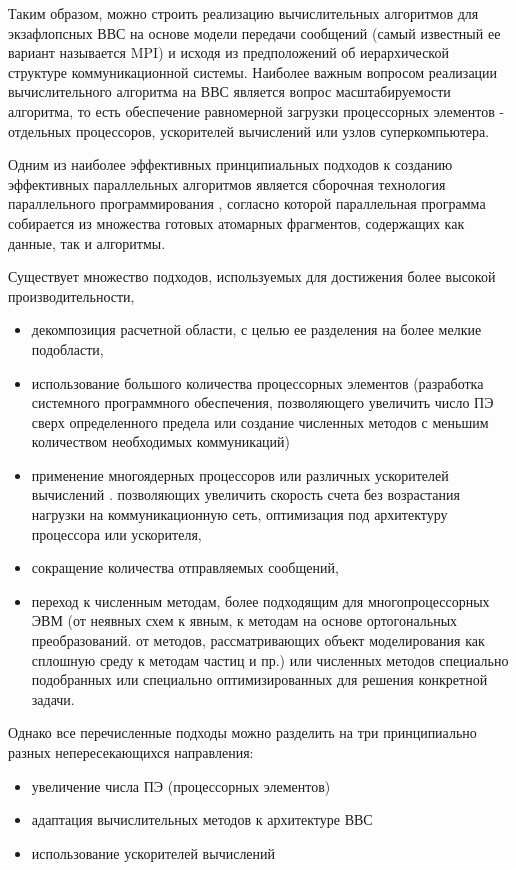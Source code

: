Таким образом, можно строить реализацию вычислительных алгоритмов для 
экзафлопсных ВВС на основе модели передачи сообщений (самый известный ее вариант называется MPI) и исходя из предположений об иерархической структуре коммуникационной системы.
Наиболее важным вопросом реализации вычислительного алгоритма на ВВС является вопрос масштабируемости алгоритма, то есть обеспечение равномерной загрузки процессорных элементов - отдельных процессоров, ускорителей вычислений или узлов суперкомпьютера.  

Одним из наиболее эффективных принципиальных подходов к созданию эффективных параллельных алгоритмов является сборочная технология параллельного программирования \cite{MalyshkinSynthesis,MalyshkinASSY,Kraeva2001,
	MalyshkinTsigulin}, согласно которой параллельная программа собирается из множества   готовых атомарных фрагментов, содержащих как данные, так и алгоритмы.

Существует множество подходов, используемых для достижения более высокой производительности, 
\begin{itemize}
	\item декомпозиция расчетной области\cite{Liewer1989,Kraeva2001,Stijnman2003, Eastwood1995}, с целью ее разделения на более мелкие подобласти, 
	\item использование большого количества процессорных элементов (разработка системного программного обеспечения, позволяющего увеличить число ПЭ сверх определенного предела
	\cite{Gropp2009} или создание численных методов с меньшим количеством необходимых коммуникаций)
	\item применение многоядерных процессоров или различных ускорителей вычислений \cite{SteYuz13}. позволяющих увеличить скорость счета без возрастания нагрузки на коммуникационную сеть, оптимизация под архитектуру процессора или ускорителя, 
	\item сокращение количества отправляемых сообщений, 
	\item переход к численным методам, более подходящим для многопроцессорных ЭВМ (от неявных схем к явным, к методам на основе ортогональных преобразований. от методов, рассматривающих объект моделирования как сплошную среду к методам частиц и пр.) или численных методов специально подобранных или специально оптимизированных для решения конкретной задачи. 
\end{itemize}

Однако все перечисленные подходы можно разделить на три принципиально разных непересекающихся направления:
\begin{itemize}
	\item увеличение числа ПЭ (процессорных элементов)
	\item адаптация вычислительных методов к архитектуре ВВС
	\item использование ускорителей вычислений 
\end{itemize}


